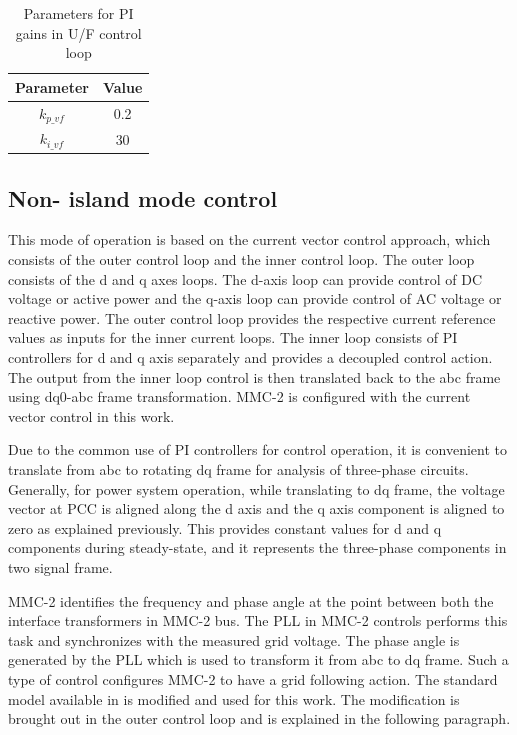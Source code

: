 \begin{table}[H]
\centering
\begin{tabular}{|c|c|}
\hline
Parameter & Value \\ \hline
$k_{p\_vf}$     & 0.2 \\ \hline
$k_{i\_vf}$     & 30 \\ \hline
\end{tabular}
\caption{Parameters for PI gains in U/F control loop \cite{vrana2013cigre}}
\label{tab:U_F_para}
\end{table}

\subsection{Non- island mode control}
This mode of operation is based on the current vector control approach, which consists of the outer control loop and the inner control loop. The outer loop consists of the d and q axes loops. The d-axis loop can provide control of \gls{DC} voltage or active power and the q-axis loop can provide control of \gls{AC} voltage or reactive power. The outer control loop provides the respective current reference values as inputs for the inner current loops. The inner loop consists of \gls{PI} controllers for d and q axis separately and provides a decoupled control action. The output from the inner loop control is then translated back to the abc frame using dq0-abc frame transformation. \gls{MMC}-2 is configured with the current vector control in this work. 

Due to the common use of \gls{PI} controllers for control operation, it is convenient to translate from abc to rotating dq frame for analysis of three-phase circuits. Generally, for power system operation, while translating to dq frame, the voltage vector at \gls{PCC} is aligned along the d axis and the q axis component is aligned to zero as explained previously. This provides constant values for d and q components during steady-state, and it represents the three-phase components in two signal frame.

\gls{MMC}-2 identifies the frequency and phase angle at the point between both the interface transformers in \gls{MMC}-2 bus. The \gls{PLL} in \gls{MMC}-2 controls performs this task and synchronizes with the measured grid voltage. The phase angle is generated by the \gls{PLL} which is used to transform it from abc to dq frame. Such a type of control configures \gls{MMC}-2 to have a grid following action. The standard model available in \cite{vrana2013cigre} is modified and used for this work. The modification is brought out in the outer control loop and is explained in the following paragraph.    

